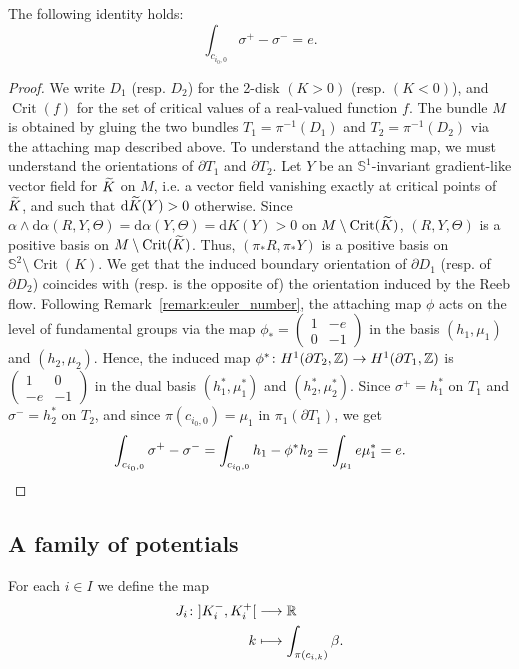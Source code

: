 \documentclass[AHL,Unicode,longabstracts]{cedram}
\DeclareMathOperator{\Crit}{Crit}
\newcommand{\bbS}{\mathbb{S}}
\newcommand{\bbZ}{\mathbb{Z}}
\newcommand{\bbR}{\mathbb{R}}
\newcommand{\rmd}{\mathrm{d}}
\renewcommand*{\to}{\mathchoice{\longrightarrow}{\rightarrow}{\rightarrow}{\rightarrow}}
\let\oldmapsto\mapsto
\renewcommand*{\mapsto}{\mathchoice{\longmapsto}{\oldmapsto}{\oldmapsto}{\oldmapsto}}
\let\oldtilde\tilde
\renewcommand*{\tilde}[1]{\mathchoice{\widetilde{#1}}{\widetilde{#1}}{\oldtilde{#1}}{\oldtilde{#1}}}
\newcommand{\bbS}{\mathbb{S}}
\begin{document}
\begin{prop}\label{prop:equality_euler_number}
The following identity holds:
\[
\int_{c_{i_0,0}} \sigma^+ - \sigma^- = e.
\]
\end{prop}

\begin{proof}
We write $D_1$ (resp. $D_2$) for the 2-disk $(K > 0)$ (resp. $(K<0)$), and $\Crit(f)$ for the set of critical values of a real-valued function $f$. The bundle $M$ is obtained by gluing the two bundles $T_1 = \pi^{-1}(D_1)$ and $T_2 = \pi^{-1}(D_2)$ via the attaching map described above. To understand the attaching map, we must understand the orientations of $\partial T_1$ and $\partial T_2$. Let $Y$ be an $\bbS^1$-invariant gradient-like vector field for $\tilde K$ on $M$, i.e. a vector field vanishing exactly at critical points of $\tilde K$, and such that $\rmd \tilde K(Y) > 0$ otherwise. Since $\alpha \wedge \rmd \alpha (R,Y,\Theta) = \rmd \alpha(Y,\Theta) = \rmd K(Y) > 0$ on $M \setminus \Crit(\tilde K)$, $(R,Y,\Theta)$ is a positive basis on $M \setminus \Crit(\tilde K)$. Thus, $(\pi_* R, \pi_* Y)$ is a positive basis on $\bbS^2 \setminus \Crit(K)$. We get that the induced boundary orientation of $\partial D_1$ (resp. of $\partial D_2$) coincides with (resp. is the opposite of) the orientation induced by the Reeb flow. Following Remark~\ref{remark:euler_number}, the attaching map $\phi$ acts on the level of fundamental groups via the map $\phi_* =
\left(\begin{smallmatrix}
1 & -e\\0 & -1
\end{smallmatrix}\right)$ in the basis $(h_1, \mu_1)$ and $(h_2, \mu_2)$. Hence, the induced map $\phi^* \colon H^1(\partial T_2, \bbZ) \to H^1(\partial T_1, \bbZ)$ is $
\left(\begin{smallmatrix}
1 & 0\\-e & -1
\end{smallmatrix}\right)$ in the dual basis $(h_1^*, \mu_1^*)$ and $(h_2^*, \mu_2^*)$. Since $\sigma^+ = h_1^*$ on $T_1$ and $\sigma^- = h_2^*$ on $T_2$, and since $\pi(c_{i_0,0}) = \mu_1$ in $\pi_1(\partial T_1)$, we get
\[
\int_{c_{i_0,0}} \sigma^+ - \sigma^- = \int_{c_{i_0,0}} h_1 - \phi^*{h_2} = \int_{\mu_1} e \mu_1^* = e.\qedhere
\]
\end{proof}


\subsection{A family of potentials}\label{sub:a_family_of_potentials}
For each $i \in I$ we define the map
\begin{align*}
J_i \colon \mathopen{]}K_i^-, K_i^+\mathclose{[} &\to \bbR \\
 k &\mapsto \int_{\pi(c_{i,k})} \beta.
\end{align*}
\end{document}
